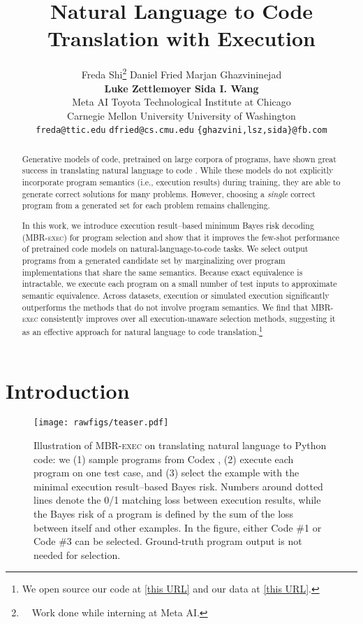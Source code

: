 \documentclass[11pt]{article}
\title{Natural Language to Code Translation with Execution}
\author{
Freda Shi\thanks{~~Work done while interning at Meta AI.} \quad
Daniel Fried  \quad
Marjan Ghazvininejad
\\
\textbf{Luke Zettlemoyer \quad
Sida I. Wang}
\\
Meta AI \quad Toyota Technological Institute at Chicago \\
Carnegie Mellon University \quad University of Washington\\
\texttt{freda@ttic.edu} \quad \texttt{dfried@cs.cmu.edu} \quad \texttt{\{ghazvini,lsz,sida\}@fb.com}
}
\newcommand{\interalia}[1]{\citep[\textit{inter alia}]{#1}}
\newcommand{\mbrexec}{\textsc{MBR-exec}\xspace}
\begin{document}
\maketitle
{}
\begin{abstract}
    Generative models of code, pretrained on large corpora of programs, have shown great success in translating natural language to code \interalia{chen2021evaluating,austin2021program,li2022competition}.
    While these models do not explicitly incorporate program semantics (i.e., execution results) during training, they are able to generate correct solutions for many problems. 
    However, choosing a \emph{single} correct program from a generated set for each problem remains challenging.

    In this work, we introduce execution result--based minimum Bayes risk decoding (\mbrexec) for program selection and show that it improves the few-shot performance of pretrained code models on natural-language-to-code tasks. We select output programs from a generated candidate set by marginalizing over program implementations that share the same semantics. Because exact equivalence is intractable, we execute each program on a small number of test inputs to approximate semantic equivalence. Across datasets, execution or simulated execution significantly outperforms the methods that do not involve program semantics. We find that \mbrexec consistently improves over all execution-unaware selection methods, suggesting it as an effective approach for natural language to code translation.\footnote{We open source our code at \href{https://github.com/facebookresearch/mbr-exec}{\textcolor{airforceblue}{[this URL]}} and our data at \href{https://dl.fbaipublicfiles.com/mbr-exec/mbr-exec-release.zip}{\textcolor{airforceblue}{[this URL]}}.}
\end{abstract} \section{Introduction}
\label{sec:intro}
\begin{figure}[t]
    \centering
    \texttt{[image: rawfigs/teaser.pdf]}
    \caption{Illustration of \mbrexec on translating natural language to Python code: we (1) sample programs from Codex \citep{chen2021evaluating}, (2) execute each program on one test case, and (3) select the example with the minimal execution result--based Bayes risk. 
    Numbers around dotted lines denote the 0/1 matching loss between execution results, while the Bayes risk of a program is defined by the sum of the loss between itself and other examples. 
    In the figure, either Code \#1 or Code \#3 can be selected. Ground-truth program output is not needed for selection.} 
    \label{fig:teaser}
\end{figure}
\end{document}
